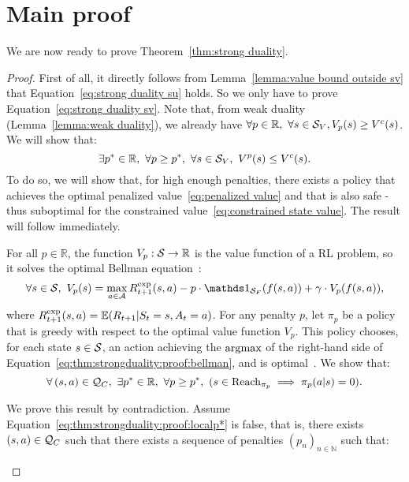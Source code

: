 \section{Main proof}
We are now ready to prove Theorem~\ref{thm:strong duality}.
\begin{proof}
	First of all, it directly follows from Lemma~\ref{lemma:value bound outside sv} that Equation~\eqref{eq:strong duality su} holds. So we only have to prove Equation~\eqref{eq:strong duality sv}. Note that, from weak duality (Lemma~\ref{lemma:weak duality}), we already have $\forall p\in\mathbb{R},~\forall s\in\SV, V_p(s) \geq V^c(s)$. We will show that:
	\begin{equation}
	\exists p^*\in\mathbb{R},~\forall p \geq p^*,~\forall s\in\SV,~V^p(s) \leq V^c(s).
	\label{eq:thm:strongduality:proof:converseinequality}
	\end{equation}
	To do so, we will show that, for high enough penalties, there exists a policy that achieves the optimal penalized value~\eqref{eq:penalized value} and that is also safe - thus suboptimal for the constrained value~\eqref{eq:constrained state value}. The result will follow immediately.\par
	For all $p\in\mathbb{R}$, the function $V_p: \S\to\mathbb{R}$ is the value function of a RL problem, so it solves the optimal Bellman equation~\cite[Chapter~3]{sutton2018reinforcement}:
	\begin{equation}
	\forall s\in\S,~ V_p(s) = \max_{a\in\A} \Rexp_{t+1}(s, a) - p \cdot \indicator_\SF(f(s,a)) + \gamma \cdot V_p(f(s,a)),
	\label{eq:thm:strongduality:proof:bellman}
	\end{equation}
	where $\Rexp_{t+1}(s, a) = \expected(R_{t+1}|S_t = s, A_t = a)$. For any penalty $p$, let $\pi_p$ be a policy that is greedy with respect to the optimal value function $V_p$. This policy chooses, for each state $s\in\S$, an action achieving the $\argmax$ of the right-hand side of Equation~\eqref{eq:thm:strongduality:proof:bellman}, and is optimal~\cite[Chapter~3]{sutton2018reinforcement}. We show that:
	\begin{equation}
	\forall\,(s,a)\in\QC,~\exists p^*\in\mathbb{R},~\forall p\geq p^*,~(s\in\reach_{\pi_p}\implies\pi_p(a|s) = 0).
	\label{eq:thm:strongduality:proof:localp*}
	\end{equation}
	\begin{subproof}
		We prove this result by contradiction. Assume Equation~\eqref{eq:thm:strongduality:proof:localp*} is false, that is, there exists $(s, a) \in\QC$ such that there exists a sequence of penalties $(p_n)_{n\in\mathbb{N}}$ such that:

\end{subproof}
\end{proof}
